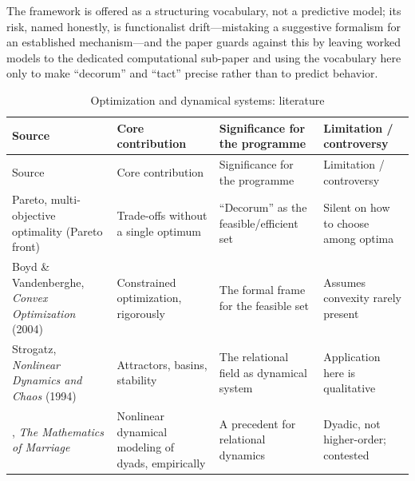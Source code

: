 The framework is offered as a structuring vocabulary, not a predictive model; its risk, named honestly, is functionalist drift---mistaking a suggestive formalism for an established mechanism---and the paper guards against this by leaving worked models to the dedicated computational sub-paper and using the vocabulary here only to make ``decorum'' and ``tact'' precise rather than to predict behavior.

\goldrule
\footnotesize
\begin{longtable}{Y Y Y Y}
\caption{Optimization and dynamical systems: literature}\label{p07:tab:lit-optim}\\
\toprule
{}
Source & Core contribution & Significance for the programme & Limitation / controversy \\
\midrule
\endfirsthead
{}
Source & Core contribution & Significance for the programme & Limitation / controversy \\
\midrule
\endhead
Pareto, multi-objective optimality (Pareto front) & Trade-offs without a single optimum & ``Decorum'' as the feasible/efficient set & Silent on how to choose among optima \\
Boyd \& Vandenberghe, \emph{Convex Optimization} (2004) & Constrained optimization, rigorously & The formal frame for the feasible set & Assumes convexity rarely present \\
Strogatz, \emph{Nonlinear Dynamics and Chaos} (1994) & Attractors, basins, stability & The relational field as dynamical system & Application here is qualitative \\
\textcite{gottman2002math}, \emph{The Mathematics of Marriage} & Nonlinear dynamical modeling of dyads, empirically & A precedent for relational dynamics & Dyadic, not higher-order; contested \\
\bottomrule
\end{longtable}

